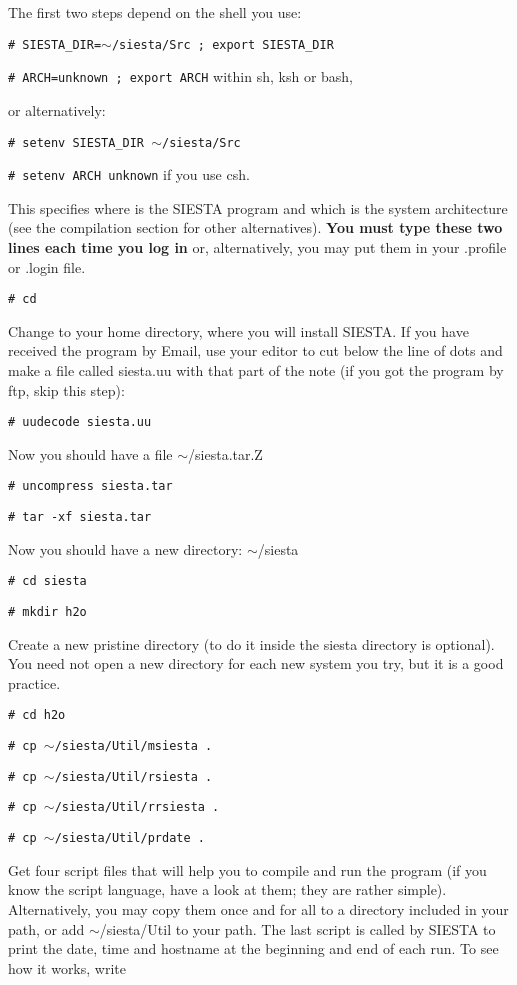 The first two steps depend on the shell you use:

{\tt \# SIESTA\_DIR=$\sim$/siesta/Src ; export SIESTA\_DIR}

{\tt \# ARCH=unknown ; export ARCH}
\hspace{1cm} within sh, ksh or bash,

or alternatively: 

\vspace{1pt}
{\tt \# setenv SIESTA\_DIR $\sim$/siesta/Src}

{\tt \# setenv ARCH unknown}
\hspace{2.5cm} if you use csh.

This specifies where is the SIESTA program and which is 
the system architecture (see the compilation section for
other alternatives). {\bf You must type these two lines
each time you log in} or, alternatively, you may put them
in your .profile or .login file.

{\tt \# cd}

Change to your home directory, where you will install SIESTA.
If you have received the program by Email, use your editor to
cut below the line of dots and make a file called siesta.uu
with that part of the note (if you got the program by ftp,
skip this step):

{\tt \# uudecode siesta.uu}

Now you should have a file $\sim$/siesta.tar.Z

{\tt \# uncompress siesta.tar}

{\tt \# tar -xf siesta.tar}

Now you should have a new directory: $\sim$/siesta

{\tt \# cd siesta}

{\tt \# mkdir h2o}

Create a new pristine directory (to do it inside the siesta
directory is optional). You need not open a new directory
for each new system you try, but it is a good practice.

{\tt \# cd h2o}

{\tt \# cp $\sim$/siesta/Util/msiesta .}

{\tt \# cp $\sim$/siesta/Util/rsiesta .}

{\tt \# cp $\sim$/siesta/Util/rrsiesta .}

{\tt \# cp $\sim$/siesta/Util/prdate .}

Get four script files that will help you to compile and
run the program (if you know the script language, have a
look at them; they are rather simple). Alternatively, you
may copy them once and for all to a directory included in 
your path, or add $\sim$/siesta/Util to your path.
The last script is called by SIESTA to print the date, time
and hostname at the beginning and end of each run.
To see how it works, write

